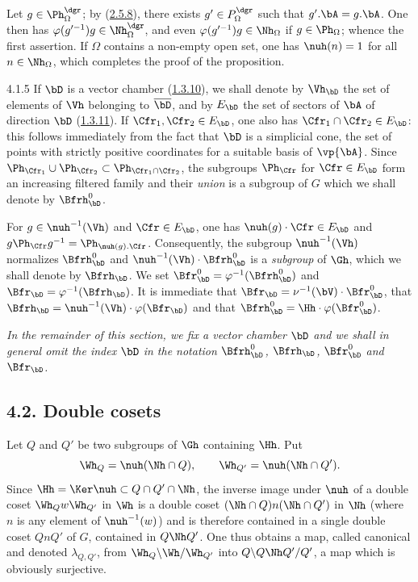 \documentclass[12pt,a4paper,oneside,english]{smfart}
\makeatletter
\newcommand{\btanchor}[1]{\leavevmode\Hy@raisedlink{\hypertarget{bt:#1}{}}}
\newcommand{\btref}[1]{\hyperlink{bt:#1}{#1}}
\newcommand{\btsecB}[2]{%
  \par\needspace{4\baselineskip}\phantomsection
  \subsection*{#2}%
  \ifx\relax#1\relax\else\btanchor{#1}\fi}
\theoremstyle{definition}
\theoremstyle{bt}
\makeatother
\begin{document}
Let $g\in\Ph^{\dgr}_{\Omega}$; by (\btref{2.5.8}), there exists
$g'\in P^{\dgr}_{\Omega}$ such that $g'.\bA = g.\bA$. One then has
$\varphi(g'^{-1})g \in \Nh^{\dgr}_{\Omega}$, and even
$\varphi(g'^{-1})g\in\Nh_{\Omega}$ if $g\in\Ph_{\Omega}$; whence the first
assertion. If $\Omega$ contains a non-empty open set, one has $\nuh(n) = 1$
for all $n\in\Nh_{\Omega}$, which completes the proof of the proposition.

\num{4.1.5}\btanchor{4.1.5}
If $\bD$ is a vector chamber (\btref{1.3.10}), we shall denote by $\Vh_{\bD}$ the set
of elements of $\Vh$ belonging to $\overline{\bD}$, and by $E_{\bD}$ the set
of sectors of $\bA$ of direction $\bD$ (\btref{1.3.11}). If
$\Cfr_1, \Cfr_2 \in E_{\bD}$, one also has $\Cfr_1\cap\Cfr_2 \in E_{\bD}$:
this follows immediately from the fact that $\bD$ is a simplicial cone, the
set of points with strictly positive coordinates for a suitable basis of
$\vp{\bA}$. Since
$\Ph_{\Cfr_1}\cup\Ph_{\Cfr_2} \subset \Ph_{\Cfr_1\cap\Cfr_2}$, the subgroups
$\Ph_{\Cfr}$ for $\Cfr\in E_{\bD}$ form an increasing filtered family and
their \emph{union} is a subgroup of $G$ which we shall denote by
$\Bfrh^{0}_{\bD}$.

For $g\in\nuh^{-1}(\Vh)$ and $\Cfr\in E_{\bD}$, one has
$\nuh(g)\cdot\Cfr \in E_{\bD}$ and
$g\Ph_{\Cfr}g^{-1} = \Ph_{\nuh(g).\Cfr}$. Consequently, the subgroup
$\nuh^{-1}(\Vh)$ normalizes $\Bfrh^{0}_{\bD}$ and
$\nuh^{-1}(\Vh)\cdot\Bfrh^{0}_{\bD}$ is a \emph{subgroup} of $\Gh$, which we
shall denote by $\Bfrh_{\bD}$. We set
$\Bfr^{0}_{\bD} = \varphi^{-1}(\Bfrh^{0}_{\bD})$ and
$\Bfr_{\bD} = \varphi^{-1}(\Bfrh_{\bD})$. It is immediate that
$\Bfr_{\bD} = \nu^{-1}(\bV)\cdot\Bfr^{0}_{\bD}$, that
$\Bfrh_{\bD} = \nuh^{-1}(\Vh)\cdot\varphi(\Bfr_{\bD})$ and that
$\Bfrh^{0}_{\bD} = \Hh\cdot\varphi(\Bfr^{0}_{\bD})$.

\emph{In the remainder of this section, we fix a vector chamber $\bD$ and we
shall in general omit the index $\bD$ in the notation $\Bfrh^{0}_{\bD}$,
$\Bfrh_{\bD}$, $\Bfr^{0}_{\bD}$ and $\Bfr_{\bD}$.}

\btsecB{4.2}{4.2. Double cosets}

Let $Q$ and $Q'$ be two subgroups of $\Gh$ containing $\Hh$. Put
\[
\Wh_{Q} = \nuh(\Nh\cap Q), \qquad \Wh_{Q'} = \nuh(\Nh\cap Q').
\]
Since $\Hh = \Ker\nuh \subset Q\cap Q'\cap\Nh$, the inverse image under
$\nuh$ of a double coset $\Wh_{Q}w\Wh_{Q'}$ in $\Wh$ is a double coset
$(\Nh\cap Q)n(\Nh\cap Q')$ in $\Nh$ (where $n$ is any element of
$\nuh^{-1}(w)$) and is therefore contained in a single double coset $QnQ'$ of
$G$, contained in $Q\Nh Q'$. One thus obtains a map, called canonical and
denoted $\lambda_{Q,Q'}$, from $\Wh_{Q}\backslash\Wh/\Wh_{Q'}$ into
$Q\backslash Q\Nh Q'/Q'$, a map which is obviously surjective.
\end{document}
